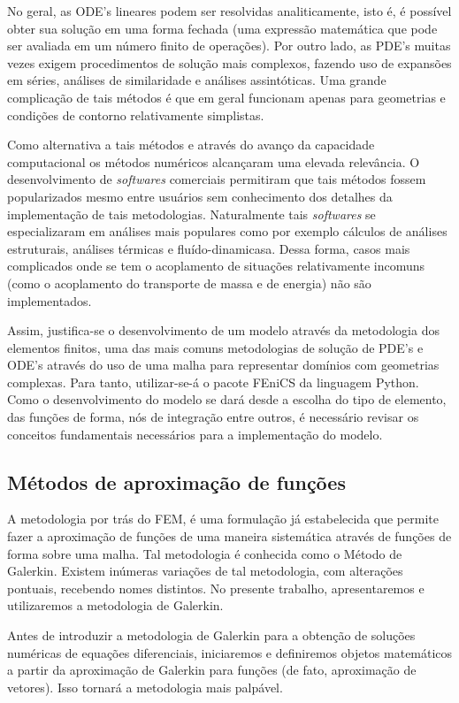 No geral, as ODE's lineares podem ser resolvidas analiticamente, isto é, é possível obter sua solução em uma forma fechada (uma expressão matemática que pode ser avaliada em um número finito de operações). Por outro lado, as PDE's muitas vezes exigem procedimentos de solução mais complexos, fazendo uso de expansões em séries, análises de similaridade e análises assintóticas. Uma grande
complicação de tais métodos é que em geral funcionam apenas para geometrias e condições de contorno relativamente simplistas.

Como alternativa a tais métodos e através do avanço da capacidade computacional os métodos numéricos alcançaram uma elevada relevância. O desenvolvimento de \textit{softwares} comerciais permitiram que tais métodos fossem popularizados mesmo entre usuários sem conhecimento dos detalhes da implementação de tais metodologias. Naturalmente tais \textit{softwares} se especializaram em análises mais populares como por exemplo cálculos de análises estruturais, análises térmicas e fluído-dinamicasa. Dessa forma, casos mais
complicados onde se tem o acoplamento de situações relativamente incomuns (como
o acoplamento do transporte de massa e de energia) não são implementados.

Assim, justifica-se o desenvolvimento de um modelo através da metodologia dos
elementos finitos, uma das mais comuns metodologias de solução de PDE's e ODE's
através do uso de uma malha para representar domínios com geometrias complexas.
Para tanto, utilizar-se-á o pacote FEniCS da linguagem Python. Como o
desenvolvimento do modelo se dará desde a escolha do tipo de elemento, das
funções de forma, nós de integração entre outros, é necessário revisar os
conceitos fundamentais necessários para a implementação do modelo.

	\subsection{Métodos de aproximação de funções}
	A metodologia por trás do FEM, é uma formulação já estabelecida que permite
  fazer a aproximação de funções de uma maneira sistemática através de funções
  de forma sobre uma malha. Tal metodologia é conhecida como o Método de Galerkin. Existem
  inúmeras variações de tal metodologia, com alterações pontuais, recebendo
  nomes distintos. No presente trabalho, apresentaremos e utilizaremos a
  metodologia de Galerkin.

  Antes de introduzir a metodologia de Galerkin para a obtenção de soluções
  numéricas de equações diferenciais, iniciaremos e definiremos objetos
  matemáticos a partir da aproximação de Galerkin para funções (de fato,
  aproximação de vetores). Isso tornará a metodologia mais palpável.

